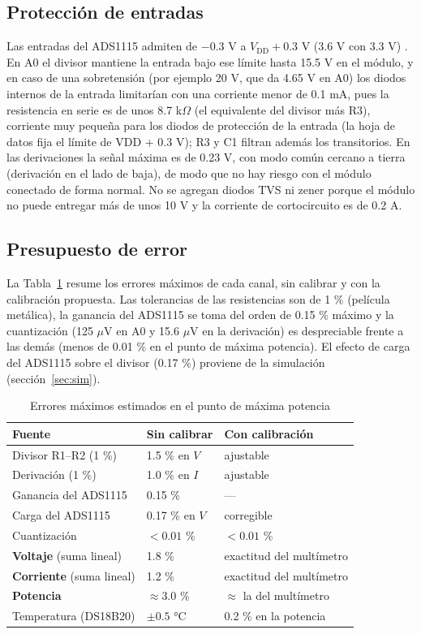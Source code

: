 \documentclass[10pt,letterpaper,twocolumn]{article}
\begin{document}
\subsection{Protección de entradas}
Las entradas del ADS1115 admiten de $-0.3$ V a $V_\mathrm{DD}+0.3$ V (3.6 V con 3.3 V) \cite{ads1115}. En A0 el divisor mantiene la entrada bajo ese límite hasta 15.5 V en el módulo, y en caso de una sobretensión (por ejemplo 20 V, que da 4.65 V en A0) los diodos internos de la entrada limitarían con una corriente menor de 0.1 mA, pues la resistencia en serie es de unos 8.7 k$\Omega$ (el equivalente del divisor más R3), corriente muy pequeña para los diodos de protección de la entrada (la hoja de datos fija el límite de VDD + 0.3 V); R3 y C1 filtran además los transitorios. En las derivaciones la señal máxima es de 0.23 V, con modo común cercano a tierra (derivación en el lado de baja), de modo que no hay riesgo con el módulo conectado de forma normal. No se agregan diodos TVS ni zener porque el módulo no puede entregar más de unos 10 V y la corriente de cortocircuito es de 0.2 A.

\subsection{Presupuesto de error}
La Tabla~\ref{tab:err} resume los errores máximos de cada canal, sin calibrar y con la calibración propuesta. Las tolerancias de las resistencias son de 1 \% (película metálica), la ganancia del ADS1115 se toma del orden de 0.15 \% máximo \cite{ads1115} y la cuantización (125 $\mu$V en A0 y 15.6 $\mu$V en la derivación) es despreciable frente a las demás (menos de 0.01 \% en el punto de máxima potencia). El efecto de carga del ADS1115 sobre el divisor (0.17 \%) proviene de la simulación (sección~\ref{sec:sim}).

\begin{table}[t]
\centering
\caption{Errores máximos estimados en el punto de máxima potencia}
\label{tab:err}
\footnotesize
\begin{tabular}{@{}p{3.1cm}p{1.9cm}p{2.3cm}@{}}
\toprule
Fuente & Sin calibrar & Con calibración\\
\midrule
Divisor R1--R2 (1 \%) & 1.5 \% en $V$ & ajustable\\
Derivación (1 \%) & 1.0 \% en $I$ & ajustable\\
Ganancia del ADS1115 & 0.15 \% & ---\\
Carga del ADS1115 & 0.17 \% en $V$ & corregible\\
Cuantización & $<0.01$ \% & $<0.01$ \%\\
\midrule
\textbf{Voltaje} (suma lineal) & 1.8 \% & exactitud del multímetro\\
\textbf{Corriente} (suma lineal) & 1.2 \% & exactitud del multímetro\\
\textbf{Potencia} & $\approx 3.0$ \% & $\approx$ la del multímetro\\
Temperatura (DS18B20) & $\pm 0.5$ °C & 0.2 \% en la potencia\\
\bottomrule
\end{tabular}
\end{table}
\end{document}
